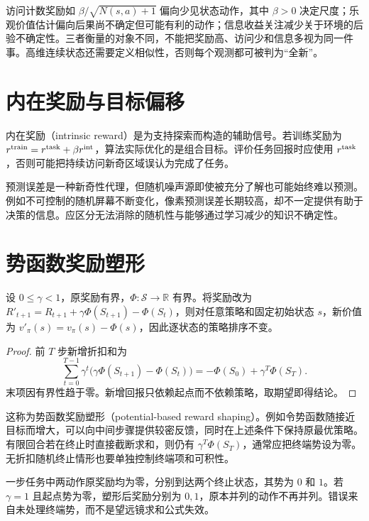 \documentclass[UTF8,12pt,a4paper,fontset=fandol]{ctexbook}
\begin{document}
访问计数奖励如 $\beta/\sqrt{N(s,a)+1}$ 偏向少见状态动作，其中 $\beta>0$ 决定尺度；乐观价值估计偏向后果尚不确定但可能有利的动作；信息收益关注减少关于环境的后验不确定性。三者衡量的对象不同，不能把奖励高、访问少和信息多视为同一件事。高维连续状态还需要定义相似性，否则每个观测都可被判为“全新”。

\section{内在奖励与目标偏移}

内在奖励（intrinsic reward）是为支持探索而构造的辅助信号。若训练奖励为 $r^{\rm train}=r^{\rm task}+\beta r^{\rm int}$，算法实际优化的是组合目标。评价任务回报时应使用 $r^{\rm task}$，否则可能把持续访问新奇区域误认为完成了任务。

预测误差是一种新奇性代理，但随机噪声源即使被充分了解也可能始终难以预测。例如不可控制的随机屏幕不断变化，像素预测误差长期较高，却不一定提供有助于决策的信息。应区分无法消除的随机性与能够通过学习减少的知识不确定性。

\section{势函数奖励塑形}

\begin{theorem}[折扣任务中的势函数塑形]
设 $0\leq\gamma<1$，原奖励有界，$\Phi:\mathcal S\to\mathbb R$ 有界。将奖励改为 $R'_{t+1}=R_{t+1}+\gamma\Phi(S_{t+1})-\Phi(S_t)$，则对任意策略和固定初始状态 $s$，新价值为 $v'_\pi(s)=v_\pi(s)-\Phi(s)$，因此逐状态的策略排序不变。
\end{theorem}
\begin{proof}
前 $T$ 步新增折扣和为
\[
\sum_{t=0}^{T-1}\gamma^t\bigl(\gamma\Phi(S_{t+1})-\Phi(S_t)\bigr)
=-\Phi(S_0)+\gamma^T\Phi(S_T).
\]
末项因有界性趋于零。新增回报只依赖起点而不依赖策略，取期望即得结论。
\end{proof}

这称为势函数奖励塑形（potential-based reward shaping）。例如令势函数随接近目标而增大，可以向中间步骤提供较密反馈，同时在上述条件下保持原最优策略。有限回合若在终止时直接截断求和，则仍有 $\gamma^T\Phi(S_T)$，通常应把终端势设为零。无折扣随机终止情形也要单独控制终端项和可积性。

\begin{example}[忽略边界会改变最优动作]
一步任务中两动作原奖励均为零，分别到达两个终止状态，其势为 $0$ 和 $1$。若 $\gamma=1$ 且起点势为零，塑形后奖励分别为 $0,1$，原本并列的动作不再并列。错误来自未处理终端势，而不是望远镜求和公式失效。
\end{example}
\end{document}
